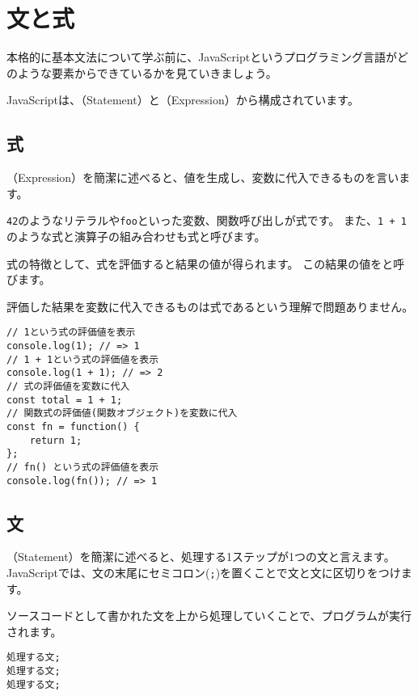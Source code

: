 \hypertarget{statement-and-expression}{%
\chapter{文と式}\label{statement-and-expression}}
\thispagestyle{frontheadings}

本格的に基本文法について学ぶ前に、JavaScriptというプログラミング言語がどのような要素からできているかを見ていきましょう。

JavaScriptは、\textbf{}（Statement）と\textbf{}（Expression）から構成されています。

\hypertarget{expression}{%
\section{式}\label{expression}}

\textbf{}（Expression）を簡潔に述べると、値を生成し、変数に代入できるものを言います。

\texttt{42}のようなリテラルや\texttt{foo}といった変数、関数呼び出しが式です。
また、\texttt{1 + 1}のような式と演算子の組み合わせも式と呼びます。

式の特徴として、式を評価すると結果の値が得られます。
この結果の値を\textbf{}と呼びます。

評価した結果を変数に代入できるものは式であるという理解で問題ありません。

\begin{lstlisting}
// 1という式の評価値を表示
console.log(1); // => 1
// 1 + 1という式の評価値を表示
console.log(1 + 1); // => 2
// 式の評価値を変数に代入
const total = 1 + 1;
// 関数式の評価値(関数オブジェクト)を変数に代入
const fn = function() {
    return 1;
};
// fn() という式の評価値を表示
console.log(fn()); // => 1
\end{lstlisting}

\hypertarget{statement}{%
\section{文}\label{statement}}

\textbf{}（Statement）を簡潔に述べると、処理する1ステップが1つの文と言えます。
JavaScriptでは、文の末尾にセミコロン(\texttt{;})を置くことで文と文に区切りをつけます。

ソースコードとして書かれた文を上から処理していくことで、プログラムが実行されます。

\begin{lstlisting}
処理する文;
処理する文;
処理する文;
\end{lstlisting}

